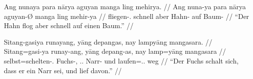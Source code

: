\documentclass[12pt,paper=a4]{scrartcl}
\newcommand{\TsgM}{{\Tsg}.{\M}}
\begin{document}
\pex %
\a\begingl
	\gla Ang nunaya para nārya aguyan manga ling mehirya. //
	\glb Ang nuna-ya para nārya aguyan-Ø manga ling mehir-ya //
	\glc \AgtT{} fliegen-\TsgM{} schnell aber Hahn-\Top{} \Dyn{} auf Baum-\Loc{} //
	\glft \enquote{Der Hahn flog aber schnell auf einen Baum.} //
\endgl

\a\begingl
	\gla Sitang-gasiya runayang, yāng depangas, nay lampyāng mangasara. //
	\glb Sitang=gasi-ya runay-ang, yāng depang-as, nay lamp=yāng mangasara //
	\glc selbst=schelten-\TsgM{} Fuchs-\Aarg{}, \TsgM{}.\Aarg{} Narr-\Parg{} und laufen=\TsgM{}.\Aarg{} weg //
	\glft \enquote{Der Fuchs schalt sich, dass er ein Narr sei, und lief davon.} //
\endgl

\xe


\vfill

\begin{multicols}{3}%
\printglossary[style=mysuper,type=\leipzigtype]
\end{multicols}

\printbibliography[heading=none]
\end{document}
